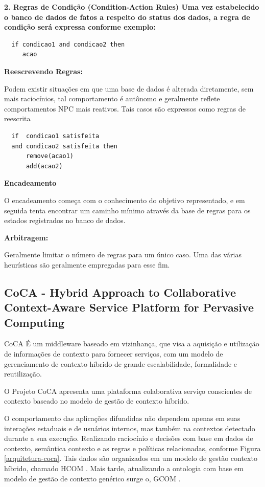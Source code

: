 \documentclass[12pt,a4paper,compsoc]{IEEEtran}
\begin{document}
  \textbf{2. Regras de Condição (Condition-Action Rules) Uma vez estabelecido o banco de dados de
  fatos a respeito do status dos dados, a regra de condição será expressa conforme exemplo:}

  \begin{lstlisting}
  if condicao1 and condicao2 then
     acao
  \end{lstlisting}

  \textbf{Reescrevendo Regras:}

  Podem existir situações em que uma base de dados é alterada diretamente, sem mais raciocínios,
  tal comportamento é autônomo e geralmente reflete comportamentos NPC mais reativos. Tais casos
  são expressos como regras de reescrita 

  \begin{lstlisting}
  if  condicao1 satisfeita
  and condicao2 satisfeita then
      remove(acao1)
      add(acao2)
  \end{lstlisting}

  \textbf{Encadeamento}
  
  O encadeamento  começa com o conhecimento do objetivo  representado, e em seguida tenta encontrar
  um caminho mínimo através da base de regras para os estados registrados no banco de dados.
  
  \textbf{Arbitragem:}
  
  Geralmente limitar o número de regras para um único caso. Uma das várias heurísticas são 
  geralmente empregadas para esse fim.


\subsection{CoCA - Hybrid Approach to Collaborative Context-Aware Service Platform for Pervasive
 Computing}

  CoCA É um middleware baseado em vizinhança, que visa a aquisição e utilização de informações de
  contexto para fornecer serviços, com um modelo de gerenciamento de contexto híbrido de grande
  escalabilidade, formalidade e reutilização.
  
  O Projeto CoCA \cite{ejigu2008hybrid} apresenta uma plataforma colaborativa serviço conscientes
  de contexto baseado no modelo de gestão de contexto híbrido.
  
  O comportamento das aplicações difundidas não dependem apenas em suas interações estaduais e de
  usuários internos, mas também na contextos detectado durante a sua execução. Realizando 
  raciocínio e decisões com base em dados de contexto, semântica contexto e as regras e políticas
  relacionadas, conforme Figura \ref{arquitetura-coca}. Tais dados são organizados em um modelo de
  gestão contexto híbrido, chamado HCOM \cite{ejigu2008hybrid}. Mais tarde, atualizando a ontologia
  com base em modelo de gestão de contexto genérico surge o, GCOM \cite{ejigu2008hybrid}.
\end{document}

